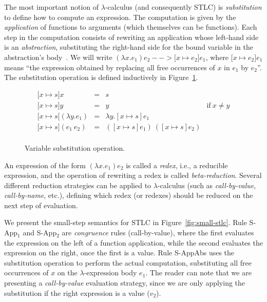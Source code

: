 \documentclass[tese,capa,english]{texufpel}
\begin{document}
The most important notion of $\lambda$-calculus (and consequently STLC) is \emph{substitution} to define how to compute an expression. The computation is given by the \emph{application} of functions to arguments (which themselves can be functions). Each step in the computation consists of rewriting an application whose left-hand side is an \emph{abstraction}, substituting the right-hand side for the bound variable in the abstraction's body~\cite{Pierce:2002:TPL:509043}. We will write $(\lambda x . e_1) e_2 --> \lbrack x \mapsto e_2 \rbrack e_1$, where $\lbrack x \mapsto e_2 \rbrack e_1$ means ``the expression obtained by replacing all free occurrences of $x$ in $e_1$ by $e_2$''. The substitution operation is defined inductively in Figure~\ref{fig:subs-stlc}.

\begin{figure}[!htb]
\[
\begin{array}{lcll}
  \lbrack x \mapsto s \rbrack x                 & = & s                                        &  \\
  \lbrack x \mapsto s \rbrack y                 & = & y                                        & \textrm{if} ~ x \neq y \\
  \lbrack x \mapsto s \lbrack (\lambda y . e_1) & = & \lambda y . [x \mapsto s] e_1            &  \\
  \lbrack x \mapsto s \rbrack (e_1 ~ e_2)       & = & ([x \mapsto s] e_1) ~ ([x \mapsto s] e_2) &  \\
\end{array}
\]
\caption{Variable substitution operation.}
\label{fig:subs-stlc}
\end{figure}

An expression of the form $(\lambda x . e_1) e_2$ is called a \emph{redex}, i.e., a reducible expression, and the operation of rewriting a redex is called \emph{beta-reduction}. Several different reduction strategies can be applied to $\lambda$-calculus (such as \emph{call-by-value}, \emph{call-by-name}, etc.), defining which redex (or redexes) should be reduced on the next step of evaluation.

We present the small-step semantics for STLC in Figure~\ref{fig:small-stlc}. Rule {\footnotesize S-App$_1$} and {\footnotesize S-App$_2$} are \emph{congruence} rules (call-by-value), where the first evaluates the expression on the left of a function application, while the second evaluates the expression on the right, once the first is a value. Rule {\footnotesize S-AppAbs} uses the substitution operation to perform the actual computation, substituting all free occurrences of $x$ on the $\lambda$-expression body $e_1$. The reader can note that we are presenting a \emph{call-by-value} evaluation strategy, since we are only applying the substitution if the right expression is a value ($v_2$). 
\end{document}
